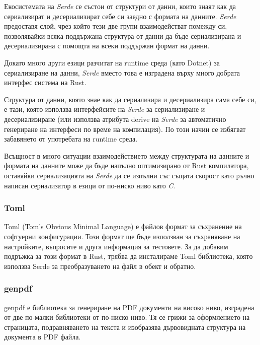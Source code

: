 Екосистемата на \textit{Serde} се състои от структури от данни, които знаят как да
сериализират и десериализират себе си заедно с формата на данните. \textit{Serde} предоставя слой, чрез
който тези две групи взаимодействат помежду си, позволявайки всяка поддържана
структура от данни да бъде сериализирана и десериализирана с помощта на всеки
поддържан формат на данни.

Докато много други езици разчитат на runtime среда (като Dotnet) за
сериализиране на данни, \textit{Serde} вместо това е изградена върху много добрата
интерфес система на Rust.

Структура от данни, която знае как да сериализира и десериализира сама себе си,
е тази, която използва интерфейсите на \textit{Serde} за сериализиране и десериализиране
(или използва атрибута derive на \textit{Serde} за автоматично генериране на интерфеси
по време на компилация). По този начин се избягват забавянето от употребата на
runtime среда.

Всъщност в много ситуации взаимодействието между структурата на данните и
формата на данните може да бъде напълно оптимизирано от Rust компилатора,
оставяйки сериализацията на \textit{Serde} да се изпълни със същата скорост като
ръчно написан сериализатор в езици от по-ниско ниво като \textit{C}.

\subsubsection{Toml}
Toml (Tom's Obvious Minimal Language) е файлов формат за съхранение на
софтуерни конфигурации. Този формат ще бъде използван за съхраняване на
настройките, въпросите и друга информация за тестовете. За да добавим подръжка
за този формат в Rust, трябва да инсталираме Toml библиотека, която използва
Serde за преобразуването на файл в обект и обратно.


\subsubsection{genpdf}
genpdf е библиотека за генериране на PDF документи на високо ниво, изградена от
две по-малки библиотеки от по-ниско ниво. Тя се грижи за оформлението на
страницата, подравняването на текста и изобразява дървовидната структура на
документа в PDF файла.
